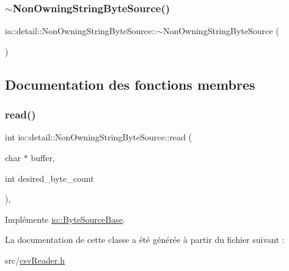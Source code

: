 \subsubsection{\texorpdfstring{$\sim$\+Non\+Owning\+String\+Byte\+Source()}{~NonOwningStringByteSource()}}
{\footnotesize\ttfamily io\+::detail\+::\+Non\+Owning\+String\+Byte\+Source\+::$\sim$\+Non\+Owning\+String\+Byte\+Source (\begin{DoxyParamCaption}{ }\end{DoxyParamCaption})\hspace{0.3cm}{\ttfamily [inline]}}



\subsection{Documentation des fonctions membres}
\mbox{\label{classio_1_1detail_1_1NonOwningStringByteSource_aba194be7e3a141f40d683db483a620bb}} 
\subsubsection{\texorpdfstring{read()}{read()}}
{\footnotesize\ttfamily int io\+::detail\+::\+Non\+Owning\+String\+Byte\+Source\+::read (\begin{DoxyParamCaption}\item[{char $\ast$}]{buffer,  }\item[{int}]{desired\+\_\+byte\+\_\+count }\end{DoxyParamCaption})\hspace{0.3cm}{\ttfamily [inline]}, {\ttfamily [virtual]}}



Implémente \hyperlink{classio_1_1ByteSourceBase_a9598bcc869b79e44da07f0e6fa478615}{io\+::\+Byte\+Source\+Base}.



La documentation de cette classe a été générée à partir du fichier suivant \+:\begin{DoxyCompactItemize}
\item 
src/\hyperlink{csvReader_8h}{csv\+Reader.\+h}\end{DoxyCompactItemize}
